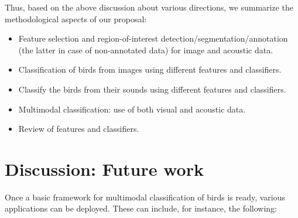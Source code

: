 \documentclass{article}
\begin{document}

Thus, based on the above discussion about various directions, we summarize the
methodological aspects of our proposal: 

\begin{itemize}
	\item Feature selection and region-of-interest
	detection/segmentation/annotation (the latter in case of non-annotated data)
	for image and acoustic data. 
    \item Classification of birds from images using different features and classifiers.  
    \item Classify the birds from their sounds using different features and classifiers.    
    \item Multimodal classification: use of both visual and acoustic data.
    \item Review of features and classifiers.
\end{itemize}




\section{Discussion: Future work}

Once a basic framework for multimodal classification of birds is ready, various
applications can be deployed. These can include, for instance, the following:
\end{document}

